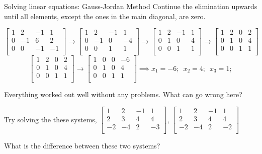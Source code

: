 \documentclass[aspectratio=169]{beamer}
\begin{document}
\begin{frame}[t]{Solving linear equations: Gauss-Jordan Method}
\noindent Continue the elimination upwards until all elements, except the ones in the main diagonal, are zero.
\begin{small}
\[
\left[
\begin{array}{rrr|r}
1 & 2 & -1 & 1 \\
0 & -1 & 6 & 2 \\
0 & 0 & -1 & -1 \\
\end{array}
\right] \longrightarrow
\left[
\begin{array}{rrr|r}
1 & 2 & -1 & 1 \\
0 & -1 & 0 & -4 \\
0 & 0 & 1 & 1 \\
\end{array}
\right] \longrightarrow
\left[
\begin{array}{rrr|r}
1 & 2 & -1 & 1 \\
0 & 1 & 0 & 4 \\
0 & 0 & 1 & 1 \\
\end{array}
\right] \longrightarrow
\left[
\begin{array}{rrr|r}
1 & 2 & 0 & 2 \\
0 & 1 & 0 & 4 \\
0 & 0 & 1 & 1 \\
\end{array}
\right]
\]
\[
\left[
\begin{array}{rrr|r}
1 & 2 & 0 & 2 \\
0 & 1 & 0 & 4 \\
0 & 0 & 1 & 1 \\
\end{array}
\right] \longrightarrow
\left[
\begin{array}{rrr|r}
1 & 0 & 0 & -6 \\
0 & 1 & 0 & 4 \\
0 & 0 & 1 & 1 \\
\end{array}
\right] \implies x_1 = -6; \,\,\, x_2 = 4; \,\,\, x_3 = 1; 
\]
\end{small}

\noindent Everything worked out well without any problems. What can go wrong here?
\vspace{0.25cm}

Try solving the these systems, $\left[\begin{array}{rrr|r}
1 & 2 & -1 & 1 \\
2 & 3 & 4 & 4 \\
-2 & -4 & 2 & -3 \\
\end{array}\right]
$, $\left[\begin{array}{rrr|r}
1 & 2 & -1 & 1 \\
2 & 3 & 4 & 4 \\
-2 & -4 & 2 & -2 \\
\end{array}\right]
$
\vspace{0.25cm}

What is the difference between these two systems?
\end{frame}
\end{document}
